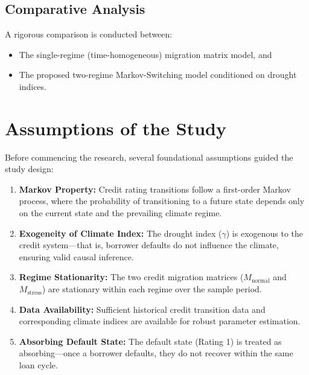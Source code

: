 \documentclass[12pt,a4paper]{article}
\newcommand{\Mnormal}{M_{\text{normal}}}
\newcommand{\Mstress}{M_{\text{stress}}}
\begin{document}
\subsection{Comparative Analysis}

A rigorous comparison is conducted between:
\begin{itemize}[noitemsep]
    \item The single-regime (time-homogeneous) migration matrix model, and
    \item The proposed two-regime Markov-Switching model conditioned on drought indices.
\end{itemize}

\section{Assumptions of the Study}

Before commencing the research, several foundational assumptions guided the study design:

\begin{enumerate}[noitemsep]
    \item \textbf{Markov Property:} Credit rating transitions follow a first-order Markov process, where the probability of transitioning to a future state depends only on the current state and the prevailing climate regime.
    
    \item \textbf{Exogeneity of Climate Index:} The drought index ($\gamma$) is exogenous to the credit system---that is, borrower defaults do not influence the climate, ensuring valid causal inference.
    
    \item \textbf{Regime Stationarity:} The two credit migration matrices ($\Mnormal$ and $\Mstress$) are stationary within each regime over the sample period.
    
    \item \textbf{Data Availability:} Sufficient historical credit transition data and corresponding climate indices are available for robust parameter estimation.
    
    \item \textbf{Absorbing Default State:} The default state (Rating 1) is treated as absorbing---once a borrower defaults, they do not recover within the same loan cycle.
\end{enumerate}
\end{document}
